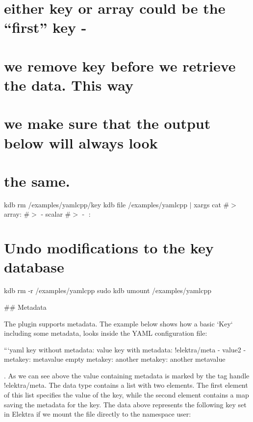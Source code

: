 \section*{either {\ttfamily key} or {\ttfamily array} could be the “first” key -\/}

\section*{we remove {\ttfamily key} before we retrieve the data. This way}

\section*{we make sure that the output below will always look}

\section*{the same.}

kdb rm /examples/yamlcpp/key kdb file /examples/yamlcpp $\vert$ xargs cat \#$>$ array\+: \#$>$ -\/ scalar \#$>$ -\/ 🔑\+: 🙈

\section*{Undo modifications to the key database}

kdb rm -\/r /examples/yamlcpp sudo kdb umount /examples/yamlcpp 
\begin{DoxyCode}
## Metadata

The plugin supports metadata. The example below shows how a basic `Key` including some metadata, looks
       inside the YAML configuration file:

```yaml
key without metadata: value
key with metadata:
  !elektra/meta
    - value2
    - metakey: metavalue
      empty metakey:
      another metakey: another metavalue
\end{DoxyCode}


. As we can see above the value containing metadata is marked by the tag handle {\ttfamily !elektra/meta}. The data type contains a list with two elements. The first element of this list specifies the value of the key, while the second element contains a map saving the metadata for the key. The data above represents the following key set in Elektra if we mount the file directly to the namespace {\ttfamily user}\+:

